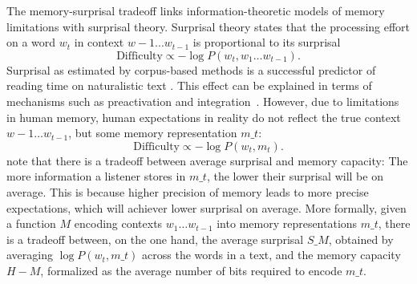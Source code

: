 \documentclass[11pt,letterpaper]{article}
\begin{document}
The memory-surprisal tradeoff links information-theoretic models of memory limitations with surprisal theory.
Surprisal theory \citep{hale2001probabilistic, levy2008expectation} states that the processing effort on a word $w_t$ in context $w-1 ... w_{t-1}$ is proportional to its surprisal
     \begin{equation}   \label{eq:true-surp}
    \text{Difficulty} \propto -\log P(w_t , w_1\dots w_{t-1}).
\end{equation}
Surprisal as estimated by corpus-based methods is a successful predictor of reading time on naturalistic text \citep{smith2013effect,goodkind-predictive-2018,frank2019interaction,aurnhammer2019evaluating,wilcox2020predictive}.
This effect can be explained in terms of mechanisms such as preactivation and integration~\citep{kuperberg2016we}.
However, due to limitations in human memory, human expectations in reality do not reflect the true context $w-1\dots w_{t-1}$, but some memory representation $m\_t$:
\begin{equation}   \label{eq:lossy-surp}
    \text{Difficulty} \propto -\log P(w_t , m_t).
\end{equation}
\citet{Hahn2020modeling} note that there is a tradeoff between average surprisal and memory capacity:
The more information a listener stores in $m\_t$, the lower their surprisal will be on average.
This is because higher precision of memory leads to more precise expectations, which will achiever lower surprisal on average.
More formally, given a function $M$ encoding contexts $w_1\dots w_{t-1}$ into memory representations $m\_t$, there is a tradeoff between, on the one hand, the average surprisal $S\_M$, obtained by averaging $\log P(w_t , m\_t)$ across the words in a text, and the memory capacity $H-M$, formalized as the average number of bits required to encode $m\_t$.
\end{document}
